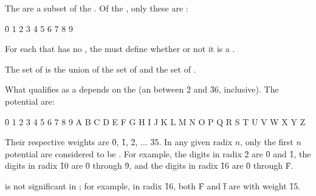 \endsubsubsubsection%

\endsubsubsection%


The   are
a subset of the  .
Of the , only these are  :

\f{0 1 2 3 4 5 6 7 8 9}

For each    
that has no , the  must define whether
or not it is a  .

\endsubsubsection%


The set of   is the union of 
    the set of   
and the set of  .

\endsubsubsection%


What qualifies as a  depends on the  
(an  between \f{2} and \f{36}, inclusive).
The potential  are:

\f{0 1 2 3 4 5 6 7 8 9 A B C D E F G H I J K L M N O P Q R S T U V W X Y Z}

Their respective weights are \f{0}, \f{1}, \f{2}, $\ldots$ \f{35}.
In any given radix $n$, only the first $n$ potential  
are considered to be .
For example,
the digits in radix \f{2}  are \f{0} and \f{1}, 
the digits in radix \f{10} are \f{0} through \f{9}, and
the digits in radix \f{16} are \f{0} through \f{F}.

 is not significant in ; 
for example, in radix \f{16}, both \f{F} and \f{f} 
are  with weight \f{15}.


